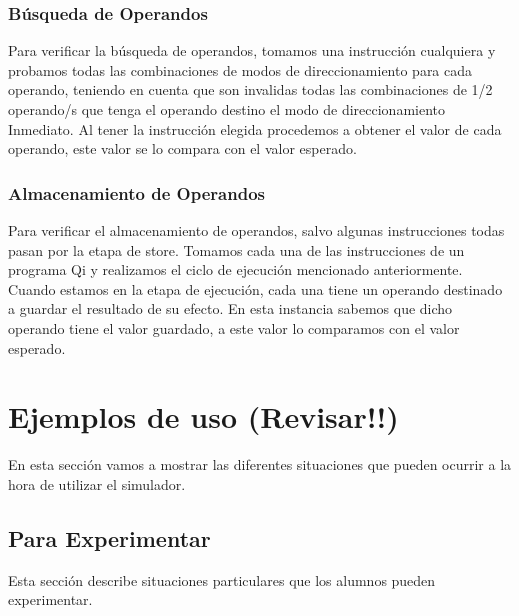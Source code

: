 \subsubsection{Búsqueda de Operandos}

Para verificar la búsqueda de operandos, tomamos una instrucción cualquiera y probamos todas las combinaciones de modos de direccionamiento para cada operando, teniendo en cuenta que son invalidas todas las combinaciones de 1/2 operando/s que tenga el operando destino el modo de direccionamiento Inmediato. Al tener la instrucción elegida procedemos a obtener el valor de cada operando, este valor se lo compara con el valor esperado. 
 
\subsubsection{Almacenamiento de Operandos}

Para verificar el almacenamiento de operandos, salvo algunas instrucciones todas pasan por la etapa de store.
Tomamos cada una de las instrucciones de un programa Qi y realizamos el ciclo de ejecución mencionado anteriormente.
Cuando estamos en la etapa de ejecución, cada una tiene un operando destinado a guardar el resultado de su efecto.
En esta instancia sabemos que  dicho operando tiene el valor guardado, a este valor lo comparamos con el valor esperado.

\section{Ejemplos de uso (Revisar!!)}

En esta sección vamos a mostrar las diferentes situaciones que pueden ocurrir a la hora de utilizar el simulador.

\subsection{Para Experimentar}

Esta sección describe situaciones particulares que los alumnos pueden experimentar.

